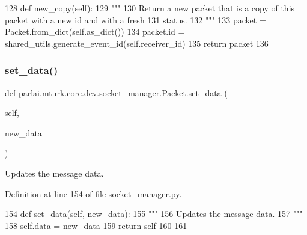 \begin{DoxyCode}
128     \textcolor{keyword}{def }new\_copy(self):
129         \textcolor{stringliteral}{"""}
130 \textcolor{stringliteral}{        Return a new packet that is a copy of this packet with a new id and with a fresh}
131 \textcolor{stringliteral}{        status.}
132 \textcolor{stringliteral}{        """}
133         packet = Packet.from\_dict(self.as\_dict())
134         packet.id = shared\_utils.generate\_event\_id(self.receiver\_id)
135         \textcolor{keywordflow}{return} packet
136 
\end{DoxyCode}
\mbox{\label{classparlai_1_1mturk_1_1core_1_1dev_1_1socket__manager_1_1Packet_a73e956631f9f7da69ec03301147f8517}} 
\subsubsection{\texorpdfstring{set\+\_\+data()}{set\_data()}}
{\footnotesize\ttfamily def parlai.\+mturk.\+core.\+dev.\+socket\+\_\+manager.\+Packet.\+set\+\_\+data (\begin{DoxyParamCaption}\item[{}]{self,  }\item[{}]{new\+\_\+data }\end{DoxyParamCaption})}

\begin{DoxyVerb}Updates the message data.
\end{DoxyVerb}
 

Definition at line 154 of file socket\+\_\+manager.\+py.


\begin{DoxyCode}
154     \textcolor{keyword}{def }set\_data(self, new\_data):
155         \textcolor{stringliteral}{"""}
156 \textcolor{stringliteral}{        Updates the message data.}
157 \textcolor{stringliteral}{        """}
158         self.data = new\_data
159         \textcolor{keywordflow}{return} self
160 
161 
\end{DoxyCode}
\mbox{\label{classparlai_1_1mturk_1_1core_1_1dev_1_1socket__manager_1_1Packet_afd43b3b84a5266bd3aaedc63a304e5a8}} 
